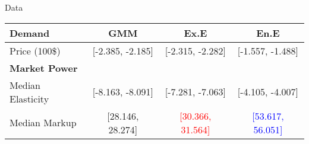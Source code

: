 \documentclass{beamer}
\begin{document}
\begin{frame}{Data}

\end{frame}

\begin{table}[h!]
    \centering
    \begin{tabular}{lccc}
        \toprule
        \textbf{Demand} & \textbf{GMM} & \textbf{Ex.E} & \textbf{En.E} \\
        \midrule
        Price (100\$) & [-2.385, -2.185] & [-2.315, -2.282] & [-1.557, -1.488] \\
        \midrule
        \textbf{Market Power} & & & \\
        \midrule
        Median Elasticity & [-8.163, -8.091] & [-7.281, -7.063] & [-4.105, -4.007] \\
        Median Markup & [28.146, 28.274] & \textcolor{red}{[30.366, 31.564]} & \textcolor{blue}{[53.617, 56.051]} \\
        \bottomrule
    \end{tabular}
\end{table}
\end{document}
